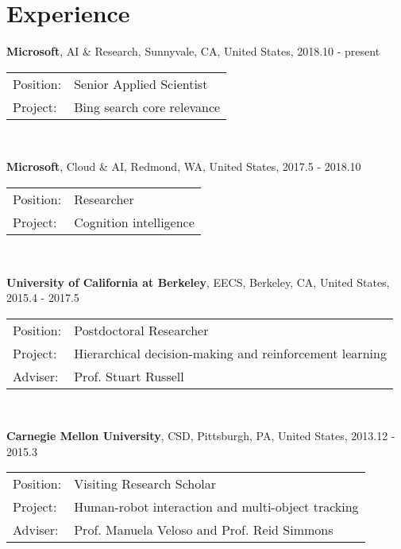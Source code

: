 \documentclass[letterpaper,10pt]{article}
\renewenvironment{itemize}{
  \begin{list}{}{
    \setlength{\leftmargin}{1.5em}
  }
}{
  \end{list}
}
\begin{document}
\section*{Experience}
\begin{itemize}
	\item \textbf{Microsoft}, AI \& Research, Sunnyvale, CA, United States, 2018.10 - present \\
	      \begin{tabular}{ll}
		      Position: & Senior Applied Scientist   \\
		      Project:  & Bing search core relevance \\
	      \end{tabular} \\
	\item \textbf{Microsoft}, Cloud \& AI, Redmond, WA, United States, 2017.5 - 2018.10 \\
	      \begin{tabular}{ll}
		      Position: & Researcher             \\
		      Project:  & Cognition intelligence \\
	      \end{tabular} \\
	\item \textbf{University of California at Berkeley}, EECS, Berkeley, CA, United States, 2015.4 - 2017.5 \\
	      \begin{tabular}{ll}
		      Position: & Postdoctoral Researcher                                 \\
		      Project:  & Hierarchical decision-making and reinforcement learning \\
		      Adviser:  & Prof. Stuart Russell                                    \\
	      \end{tabular} \\
	\item \textbf{Carnegie Mellon University}, CSD, Pittsburgh, PA, United States, 2013.12 - 2015.3 \\
	      \begin{tabular}{ll}
		      Position: & Visiting Research Scholar                         \\
		      Project:  & Human-robot interaction and multi-object tracking \\
		      Adviser:  & Prof. Manuela Veloso and Prof. Reid Simmons       \\
	      \end{tabular} \\

\end{itemize}
\end{document}
